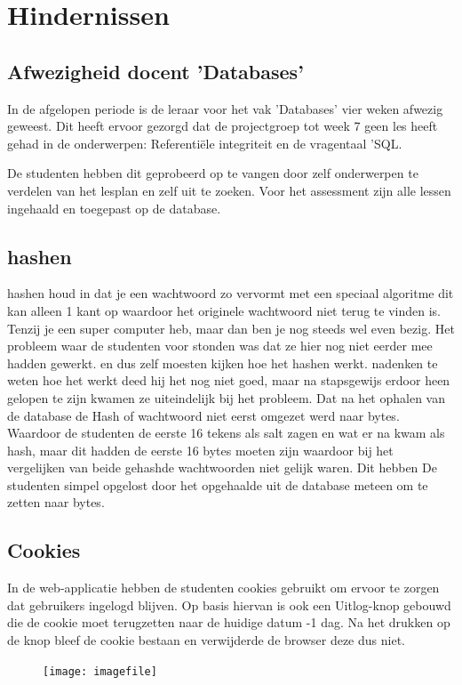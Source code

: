 \documentclass[11pt]{article}
\begin{document}
	\section{Hindernissen}
	
	\subsection{Afwezigheid docent 'Databases'}
	In de afgelopen periode is de leraar voor het vak 'Databases' vier weken afwezig geweest. Dit heeft ervoor gezorgd dat de projectgroep tot week 7 geen les heeft gehad in de onderwerpen: Referentiële integriteit en de vragentaal 'SQL.
	
	De studenten hebben dit geprobeerd op te vangen door zelf onderwerpen te verdelen van het lesplan en zelf uit te zoeken. Voor het assessment zijn alle lessen ingehaald en toegepast op de database. 
	
	\subsection{hashen}
	hashen houd in dat je een wachtwoord zo vervormt met een speciaal algoritme dit kan alleen 1 kant op waardoor het originele wachtwoord niet terug te vinden is. Tenzij je een super computer heb, maar dan ben je nog steeds wel even bezig. Het probleem waar de studenten voor stonden was dat ze hier nog niet eerder mee hadden gewerkt. en dus zelf moesten kijken	hoe het hashen werkt. nadenken te weten hoe het werkt deed hij het nog niet goed, maar na stapsgewijs erdoor heen gelopen te zijn kwamen ze uiteindelijk bij het probleem. Dat na het ophalen van de database de Hash of wachtwoord niet eerst omgezet werd naar bytes. Waardoor de studenten de eerste 16 tekens als salt zagen en wat er na kwam als hash, maar dit hadden de eerste 16 bytes moeten zijn waardoor bij het vergelijken van beide gehashde wachtwoorden niet gelijk waren. Dit hebben De studenten simpel opgelost door het opgehaalde uit de database meteen om te zetten naar bytes.
	
	\subsection{Cookies}
	In de web-applicatie hebben de studenten cookies gebruikt om ervoor te zorgen dat gebruikers ingelogd blijven. Op basis hiervan is ook een Uitlog-knop gebouwd die de cookie moet terugzetten naar de huidige datum -1 dag. Na het drukken op de knop bleef de cookie bestaan en verwijderde de browser deze dus niet. 
	\begin{figure}
		\centering
	\texttt{[image: imagefile]}
	\end{figure}
	
\end{document}
